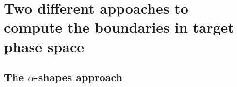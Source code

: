 \chapter{Two different appoaches to compute the boundaries in target phase space}\label{chap:boundaries_alpha}
\section{The $\alpha$-shapes approach}

